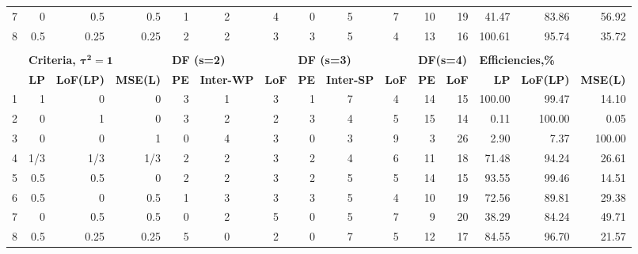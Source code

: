 \begin{table}[h]
{\begin{tabular}{rrrrccccccrrrrr}
7 & 0    & 0.5  & 0.5  & \multicolumn{1}{|r}{1} & 2 & 4 & \multicolumn{1}{|r}{0} & 5 & 7  & \multicolumn{1}{|r}{10} & 19 & \multicolumn{1}{|r}{41.47}  & 83.86  & 56.92  \\
8 & 0.5  & 0.25 & 0.25 & \multicolumn{1}{|r}{2} & 2 & 3 & \multicolumn{1}{|r}{3} & 5 & 4  & \multicolumn{1}{|r}{13} & 16 & \multicolumn{1}{|r}{100.61} & 95.74  & 35.72  \\
  &      &      &      &   &   &   &   &   &    &    &    &        &        &        \\ 
  & \multicolumn{3}{l}{\textbf{Criteria, $\bm{\tau^2=1}$}}    & \multicolumn{3}{l}{\textbf{DF (s=2)}}   & \multicolumn{3}{l}{\textbf{DF (s=3)}}    & \multicolumn{2}{l}{\textbf{DF(s=4)}} & \multicolumn{3}{l}{\textbf{Efficiencies,\%}}     \\
  & \textbf{LP} & \textbf{LoF(LP)} & \textbf{MSE(L)} & \textbf{PE} & \textbf{Inter-WP} & \textbf{LoF} & \textbf{PE} & \textbf{Inter-SP} & \textbf{LoF}& \textbf{PE}      & \textbf{LoF}      & \textbf{LP} & \textbf{LoF(LP)} & \textbf{MSE(L)} \\  
 1 & 1    & 0    & 0   & \multicolumn{1}{|r}{3} & 1 & 3 & \multicolumn{1}{|r}{1} & 7 & 4  & \multicolumn{1}{|r}{14} & 15 & \multicolumn{1}{|r}{100.00} & 99.47  & 14.10  \\
2 & 0    & 1    & 0    & \multicolumn{1}{|r}{3} & 2 & 2 & \multicolumn{1}{|r}{3} & 4 & 5  & \multicolumn{1}{|r}{15} & 14 & \multicolumn{1}{|r}{0.11}   & 100.00 & 0.05   \\
3 & 0    & 0    & 1    & \multicolumn{1}{|r}{0} & 4 & 3 & \multicolumn{1}{|r}{0} & 3 & 9  & \multicolumn{1}{|r}{3}  & 26 & \multicolumn{1}{|r}{2.90}   & 7.37   & 100.00 \\
4 & 1/3 & 1/3 & 1/3    & \multicolumn{1}{|r}{2} & 2 & 3 & \multicolumn{1}{|r}{2} & 4 & 6  & \multicolumn{1}{|r}{11} & 18 & \multicolumn{1}{|r}{71.48}  & 94.24  & 26.61  \\
5 & 0.5  & 0.5  & 0    & \multicolumn{1}{|r}{2} & 2 & 3 & \multicolumn{1}{|r}{2} & 5 & 5  & \multicolumn{1}{|r}{14} & 15 & \multicolumn{1}{|r}{93.55}  & 99.46  & 14.51  \\
6 & 0.5  & 0    & 0.5  & \multicolumn{1}{|r}{1} & 3 & 3 & \multicolumn{1}{|r}{3} & 5 & 4  & \multicolumn{1}{|r}{10} & 19 & \multicolumn{1}{|r}{72.56}  & 89.81  & 29.38  \\
7 & 0    & 0.5  & 0.5  & \multicolumn{1}{|r}{0} & 2 & 5 & \multicolumn{1}{|r}{0} & 5 & 7  & \multicolumn{1}{|r}{9}  & 20 & \multicolumn{1}{|r}{38.29}  & 84.24  & 49.71  \\
8 & 0.5  & 0.25 & 0.25 & \multicolumn{1}{|r}{5} & 0 & 2 & \multicolumn{1}{|r}{0} & 7 & 5  & \multicolumn{1}{|r}{12} & 17 & \multicolumn{1}{|r}{84.55}  & 96.70  & 21.57 
\end{tabular}
}
\end{table}  

